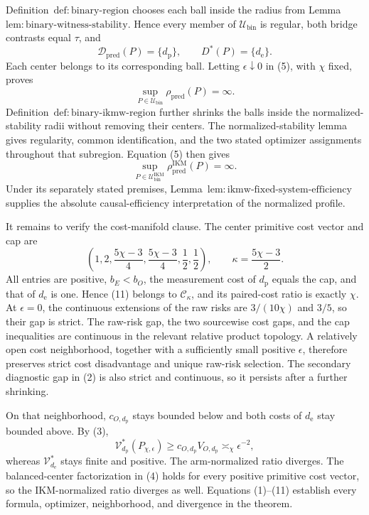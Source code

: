 Definition~\(\mathrm{def{:}binary\text{-}region}\) chooses each ball inside the radius from Lemma~\(\mathrm{lem{:}binary\text{-}witness\text{-}stability}\). Hence every member of \(\mathcal U_{\mathrm{bin}}\) is regular, both bridge contrasts equal \(\tau\), and
\[
 \mathcal D_{\mathrm{pred}}(P)=\{d_{\mathrm p}\},
 \qquad D^*(P)=\{d_{\mathrm e}\}. \tag{8}
\]
Each center belongs to its corresponding ball. Letting \(\epsilon\downarrow0\) in (5), with \(\chi\) fixed, proves
\[
 \sup_{P\in\mathcal U_{\mathrm{bin}}}\rho_{\mathrm{pred}}(P)=\infty. \tag{9}
\]
Definition~\(\mathrm{def{:}binary\text{-}ikmw\text{-}region}\) further shrinks the balls inside the normalized-stability radii without removing their centers. The normalized-stability lemma gives regularity, common identification, and the two stated optimizer assignments throughout that subregion. Equation (5) then gives
\[
 \sup_{P\in\mathcal U_{\mathrm{bin}}^{\mathrm{IKM}}}
 \rho_{\mathrm{pred}}^{\mathrm{IKM}}(P)=\infty. \tag{10}
\]
Under its separately stated premises, Lemma~\(\mathrm{lem{:}ikmw\text{-}fixed\text{-}system\text{-}efficiency}\) supplies the absolute causal-efficiency interpretation of the normalized profile.

It remains to verify the cost-manifold clause. The center primitive cost vector and cap are
\[
 \left(1,2,\frac{5\chi-3}{4},\frac{5\chi-3}{4},\frac12,\frac12\right),
 \qquad \kappa=\frac{5\chi-3}{2}. \tag{11}
\]
All entries are positive, \(b_E<b_O\), the measurement cost of \(d_{\mathrm p}\) equals the cap, and that of \(d_{\mathrm e}\) is one. Hence (11) belongs to \(\mathcal C_\kappa\), and its paired-cost ratio is exactly \(\chi\). At \(\epsilon=0\), the continuous extensions of the raw risks are \(3/(10\chi)\) and \(3/5\), so their gap is strict. The raw-risk gap, the two sourcewise cost gaps, and the cap inequalities are continuous in the relevant relative product topology. A relatively open cost neighborhood, together with a sufficiently small positive \(\epsilon\), therefore preserves strict cost disadvantage and unique raw-risk selection. The secondary diagnostic gap in (2) is also strict and continuous, so it persists after a further shrinking.

On that neighborhood, \(c_{O,d_{\mathrm p}}\) stays bounded below and both costs of \(d_{\mathrm e}\) stay bounded above. By (3),
\[
 \mathcal V_{d_{\mathrm p}}^*(P_{\chi,\epsilon})
 \ge c_{O,d_{\mathrm p}}V_{O,d_{\mathrm p}}\asymp_\chi\epsilon^{-2},
\]
whereas \(\mathcal V_{d_{\mathrm e}}^*\) stays finite and positive. The arm-normalized ratio diverges. The balanced-center factorization in (4) holds for every positive primitive cost vector, so the IKM-normalized ratio diverges as well. Equations (1)--(11) establish every formula, optimizer, neighborhood, and divergence in the theorem.